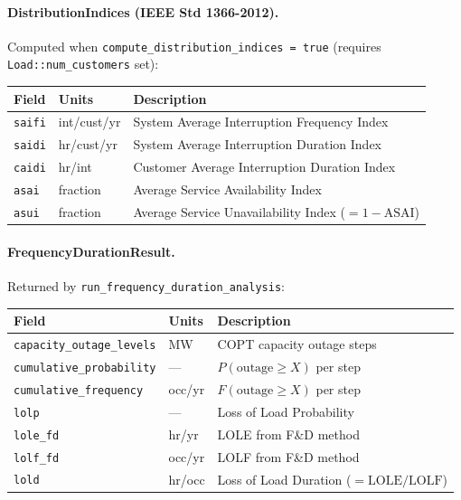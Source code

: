 \paragraph{DistributionIndices (IEEE Std 1366-2012).}
Computed when \texttt{compute\_distribution\_indices = true} (requires
\texttt{Load::num\_customers} set):

\begin{center}
\begin{tabular}{lll}
\hline\hline
\textbf{Field} & \textbf{Units} & \textbf{Description} \\
\hline
\texttt{saifi} & int/cust/yr & System Average Interruption Frequency Index \\
\texttt{saidi} & hr/cust/yr & System Average Interruption Duration Index \\
\texttt{caidi} & hr/int & Customer Average Interruption Duration Index \\
\texttt{asai} & fraction & Average Service Availability Index \\
\texttt{asui} & fraction & Average Service Unavailability Index ($= 1 - \mathrm{ASAI}$) \\
\hline\hline
\end{tabular}
\end{center}

\paragraph{FrequencyDurationResult.}
Returned by \texttt{run\_frequency\_duration\_analysis}:

\begin{center}
\begin{tabular}{lll}
\hline\hline
\textbf{Field} & \textbf{Units} & \textbf{Description} \\
\hline
\texttt{capacity\_outage\_levels} & MW & COPT capacity outage steps \\
\texttt{cumulative\_probability} & --- & $P(\text{outage} \ge X)$ per step \\
\texttt{cumulative\_frequency} & occ/yr & $F(\text{outage} \ge X)$ per step \\
\texttt{lolp} & --- & Loss of Load Probability \\
\texttt{lole\_fd} & hr/yr & LOLE from F\&D method \\
\texttt{lolf\_fd} & occ/yr & LOLF from F\&D method \\
\texttt{lold} & hr/occ & Loss of Load Duration ($= \mathrm{LOLE}/\mathrm{LOLF}$) \\
\hline\hline
\end{tabular}
\end{center}

